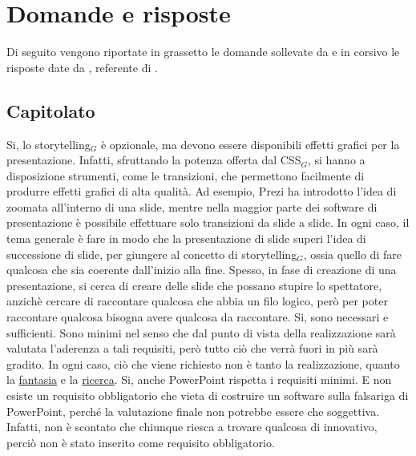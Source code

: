 \section{Domande e risposte}
Di seguito vengono riportate in grassetto le domande sollevate da \gruppo e in corsivo le risposte date da , 
referente di \proponente.
\subsection{Capitolato}
%
{Si, lo storytelling$_G$ è opzionale, ma devono essere disponibili effetti grafici per la
presentazione.
Infatti, sfruttando la potenza offerta dal CSS$_G$, si hanno a disposizione strumenti, come le transizioni, 
che permettono facilmente di produrre effetti grafici di alta qualità.
Ad esempio, Prezi ha introdotto l'idea di zoomata all'interno di una slide, mentre nella maggior parte dei software di presentazione 
è possibile effettuare solo transizioni da slide a slide. 
In ogni caso, il tema generale è fare in modo che la presentazione di slide superi l'idea di successione di slide, per giungere 
al concetto di storytelling$_G$, ossia quello di fare qualcosa che sia coerente dall'inizio alla fine.
Spesso, in fase di creazione di una presentazione, si cerca di creare delle slide che possano stupire lo spettatore, 
anzichè cercare di raccontare qualcosa che abbia un filo logico, però per poter raccontare qualcosa bisogna avere qualcosa da 
raccontare.}
\chrule
{}%
{Si, sono necessari e sufficienti. Sono minimi nel senso che dal punto di vista della 
realizzazione sarà valutata l'aderenza a tali requisiti, però tutto ciò che verrà fuori in più sarà gradito.
In ogni caso, ciò che viene richiesto non è tanto la realizzazione, quanto la \underline{fantasia} e la \underline{ricerca}.}
\chrule
{}
{Si, anche PowerPoint rispetta i requisiti minimi. 
E non esiste un requisito obbligatorio che vieta di costruire un software sulla falsariga di PowerPoint, perché la valutazione finale non potrebbe essere che soggettiva. 
Infatti, non è scontato che chiunque riesca a trovare qualcosa di innovativo, perciò non è stato inserito come requisito obbligatorio.}
